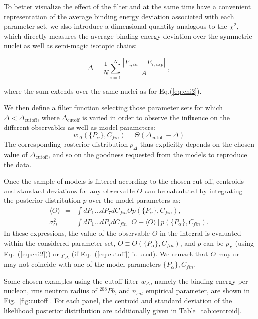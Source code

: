 \documentclass
[aps,prc,twocolumn,showpacs,showkeys,amsmath,floatfix,superscriptaddress]{revtex4}
\begin{document}
{{To better visualize the effect of the filter and at the same time have a convenient representation of the average binding energy 
deviation associated with each parameter set, 
we  also introduce a dimensional quantity analogous to the $\chi^2$, which directly measures the average binding energy deviation over the symmetric nuclei as well as  semi-magic isotopic chains:
 
\begin{equation}
\Delta = \frac{1}{N}  \sum_{i=1}^{N}   \frac{\left|E_{i,th}-E_{i,exp} \right|}{A} ~,
\label{eq:delta}
\end{equation}
 
where the sum extends over the same nuclei as for Eq.(\ref{eq:chi2}).
 
We then define a filter function selecting  those parameter sets for which $\Delta < \Delta_\mathrm{cutoff}$, where $\Delta_\mathrm{cutoff}$ is varied  in order to
observe the influence on the different observables as well as model parameters:
\begin{equation}
w_{\Delta}(\{P_\alpha\},C_{fin})=\Theta ( \Delta_\mathrm{cutoff}-\Delta)
\label{eq:cutoff}
\end{equation}
The corresponding posterior distribution $p_\Delta$ thus explicitly depends on the chosen 
value of $\Delta_\mathrm{cutoff}$, and so on the goodness requested from the models to reproduce the data.

Once the sample of models is filtered according to the chosen cut-off,  
centroids and standard deviations for any observable $O$ can be calculated by integrating the posterior  distribution $p$  over the   model parameters as:
\begin{eqnarray}
\langle O \rangle &=& \int dP_1\dots dP_7 dC_{fin} O 
 p(\{P_\alpha\},C_{fin}), \\
 \sigma^2_O &=& \int dP_1\dots dP_7 dC_{fin} \left [ O 
-\langle O \rangle \right ]
 p(\{P_\alpha\},C_{fin}).
\end{eqnarray}
In these expressions, the value of the observable $O$ in the integral is evaluated within the considered parameter set, $O\equiv O(\{P_\alpha\},C_{fin})$, and $p$ can be $p_\chi$ (using Eq.~(\ref{eq:chi2})) or $p_\Delta$ (if Eq.~(\ref{eq:cutoff}) is used). We remark that $O$
may or may not coincide with one of the model parameters $\{P_\alpha\},C_{fin}$.   

 Some chosen examples using the cutoff filter $w_\Delta$, namely the binding energy per nucleon, rms neutron radius of $^{208}Pb$, and $ n_{sat}$ empirical parameter, 
 are shown in Fig.~\ref{fig:cutoff}. 
For each panel, the centroid and standard deviation of the likelihood posterior distribution are additionally given in Table~\ref{tab:centroid}.
\\
 

}}
\end{document}
